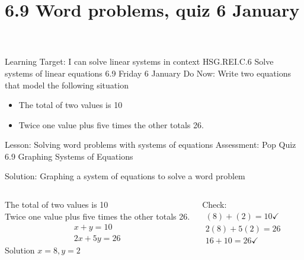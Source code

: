 \section{6.9 Word problems, quiz \hfill 6 January \,}
\begin{frame}{Learning Target: I can solve linear systems in context}
  {HSG.REI.C.6 Solve systems of linear equations \hfill \alert{6.9 Friday 6 January}}
  Do Now: Write two equations that model the following situation
  \begin{itemize}
    \item The total of two values is 10
    \item Twice one value plus five times the other totals 26. \medskip
  \end{itemize}
  Lesson: Solving word problems with systems of equations
  Assessment: Pop Quiz 6.9 Graphing Systems of Equations
\end{frame}

\begin{frame}{Solution: Graphing a system of equations to solve a word problem}
  \begin{columns}
    The total of two values is 10 \\
    Twice one value plus five times the other totals 26.
    \begin{align*}
      x+y=10 \\
      2x+5y=26
    \end{align*}
    Solution $x=8, y=2$ \par \medskip
    Check:
    \begin{align*}
      (8)+(2)=10  \checkmark \\
      2(8)+5(2)=26 \\
      16+10=26 \checkmark
    \end{align*}
    \begin{flushright}
    \end{flushright}
  \end{columns}
\end{frame}

